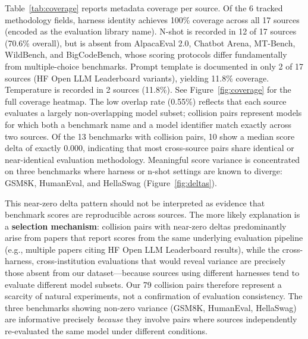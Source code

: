\documentclass[11pt]{article}
\begin{document}
Table~\ref{tab:coverage} reports metadata coverage per source.
Of the 6 tracked methodology fields, harness identity achieves 100\%
coverage across all 17 sources (encoded as the evaluation library name).
N-shot is recorded in 12 of 17 sources (70.6\% overall), but is absent
from AlpacaEval 2.0, Chatbot Arena, MT-Bench, WildBench, and BigCodeBench,
whose scoring protocols differ fundamentally from multiple-choice benchmarks.
Prompt template is documented in only 2 of 17 sources (HF Open LLM
Leaderboard variants), yielding 11.8\% coverage.
Temperature is recorded in 2 sources (11.8\%).
See Figure~\ref{fig:coverage} for the full coverage heatmap.
The low overlap rate (0.55\%) reflects that each source evaluates
a largely non-overlapping model subset; collision pairs represent
models for which both a benchmark name and a model identifier match
exactly across two sources.
Of the 13 benchmarks with collision pairs, 10 show a median score delta
of exactly 0.000, indicating that most cross-source pairs share identical
or near-identical evaluation methodology.
Meaningful score variance is concentrated on three benchmarks where
harness or n-shot settings are known to diverge: GSM8K, HumanEval, and
HellaSwag (Figure~\ref{fig:deltas}).

This near-zero delta pattern should not be interpreted as evidence
that benchmark scores are reproducible across sources.
The more likely explanation is a \textbf{selection mechanism}:
collision pairs with near-zero deltas predominantly arise from
papers that report scores from the same underlying evaluation
pipeline (e.g., multiple papers citing HF Open LLM Leaderboard
results), while the cross-harness, cross-institution evaluations
that would reveal variance are precisely those absent from our
dataset---because sources using different harnesses tend to
evaluate different model subsets.
Our 79 collision pairs therefore represent a scarcity of natural
experiments, not a confirmation of evaluation consistency.
The three benchmarks showing non-zero variance (GSM8K, HumanEval,
HellaSwag) are informative precisely \emph{because} they involve
pairs where sources independently re-evaluated the same model under
different conditions.
\end{document}
